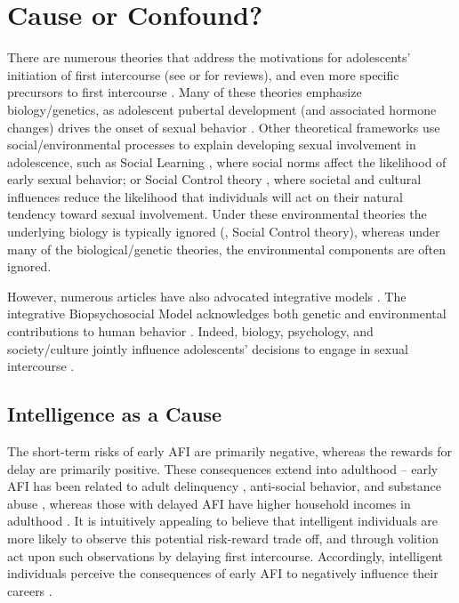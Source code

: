 \section{Cause or Confound?}
There are numerous theories that address the motivations for adolescents' initiation of first intercourse (see \citealp{Rodgers1996} or \citealp{Buhi2007} for reviews), and even more specific precursors to first intercourse \citep{Buhi2007,DOnofrio2010,kirby2002antecedents,miller1997timing,santelli1992risk}. Many of these theories emphasize biology/genetics, as adolescent pubertal development (and associated hormone changes) drives the onset of sexual behavior \citep{miller1999dopamine,udry1979age,udry1994nature}. Other theoretical frameworks use social/environmental processes to explain developing sexual involvement in adolescence, such as Social Learning \citep{diblasio1990adolescent,hogben1998using}, where social norms affect the likelihood of early sexual behavior; or Social Control theory \citep{hirschi2002causes}, where societal and cultural influences reduce the likelihood that individuals will act on their natural tendency toward sexual involvement. Under these environmental theories the underlying biology is typically ignored (\eg, Social Control theory), whereas under many of the biological/genetic theories, the environmental components are often ignored.

However, numerous articles have also advocated integrative models \citep[See][]{harden2008rethinking,harden2014genetic,udry1995sociology}. The integrative Biopsychosocial Model acknowledges both genetic and environmental contributions to human behavior \citep{Engel1977,petersen1987nature,rodgers1999nature}. Indeed, biology, psychology, and society/culture jointly influence adolescents' decisions to engage in sexual intercourse \citep{Meschke2000,zimmer2008ten}.
%
\subsection{Intelligence as a Cause}
The short-term risks of early AFI are primarily negative, whereas the rewards for delay are primarily positive. These consequences extend into adulthood -- early AFI has been related to adult delinquency \citep{harden2008rethinking}, anti-social behavior, and substance abuse \citep{boislard2011individual}, whereas those with delayed AFI have higher household incomes in adulthood \citep{Harden2012}. It is intuitively appealing to believe that intelligent individuals are more likely to observe this potential risk-reward trade off, and through volition act upon such observations by delaying first intercourse. Accordingly, intelligent individuals perceive the consequences of early AFI to negatively influence their careers \citep{halpern2000smart,harden2011don}.

